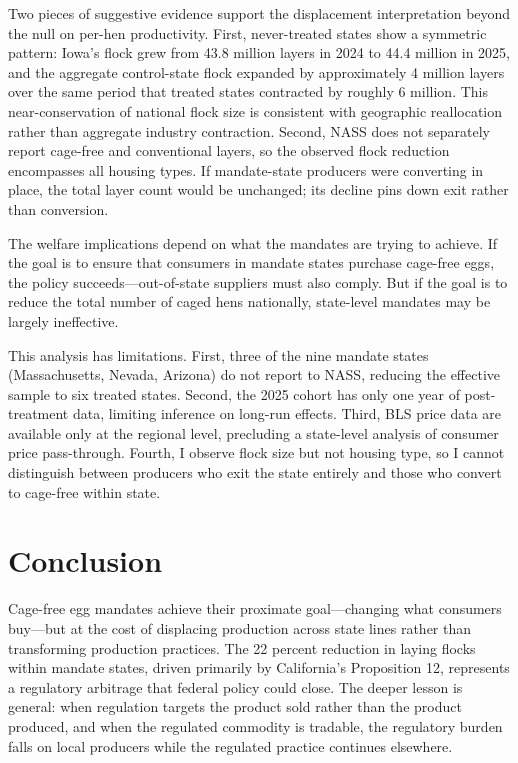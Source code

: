 \documentclass[12pt]{article}
\begin{document}
Two pieces of suggestive evidence support the displacement interpretation beyond the null on per-hen productivity. First, never-treated states show a symmetric pattern: Iowa's flock grew from 43.8 million layers in 2024 to 44.4 million in 2025, and the aggregate control-state flock expanded by approximately 4 million layers over the same period that treated states contracted by roughly 6 million. This near-conservation of national flock size is consistent with geographic reallocation rather than aggregate industry contraction. Second, NASS does not separately report cage-free and conventional layers, so the observed flock reduction encompasses all housing types. If mandate-state producers were converting in place, the total layer count would be unchanged; its decline pins down exit rather than conversion.

The welfare implications depend on what the mandates are trying to achieve. If the goal is to ensure that consumers in mandate states purchase cage-free eggs, the policy succeeds---out-of-state suppliers must also comply. But if the goal is to reduce the total number of caged hens nationally, state-level mandates may be largely ineffective.

This analysis has limitations. First, three of the nine mandate states (Massachusetts, Nevada, Arizona) do not report to NASS, reducing the effective sample to six treated states. Second, the 2025 cohort has only one year of post-treatment data, limiting inference on long-run effects. Third, BLS price data are available only at the regional level, precluding a state-level analysis of consumer price pass-through. Fourth, I observe flock size but not housing type, so I cannot distinguish between producers who exit the state entirely and those who convert to cage-free within state.


\section{Conclusion}

Cage-free egg mandates achieve their proximate goal---changing what consumers buy---but at the cost of displacing production across state lines rather than transforming production practices. The 22 percent reduction in laying flocks within mandate states, driven primarily by California's Proposition 12, represents a regulatory arbitrage that federal policy could close. The deeper lesson is general: when regulation targets the product sold rather than the product produced, and when the regulated commodity is tradable, the regulatory burden falls on local producers while the regulated practice continues elsewhere.
\end{document}
